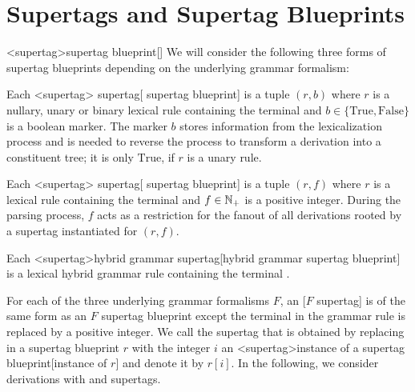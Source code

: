 \documentclass[../../document.tex]{subfiles}
\begin{document}
    \section{Supertags and Supertag Blueprints}\label{sec:supertags}<supertag>{supertag blueprint}[]
    We will consider the following three forms of supertag blueprints depending on the underlying grammar formalism:
    \begin{compactenum}
        \item
            Each <supertag>{ supertag}[ supertag blueprint] is a tuple \((r, b)\) where \(r\) is a nullary, unary or binary lexical  rule containing the terminal \wildcard{} and \(b \in \{\text{True}, \text{False}\}\) is a boolean marker.
            The marker \(b\) stores information from the lexicalization process and is needed to reverse the process to transform a derivation into a constituent tree; it is only \(\text{True}\), if \(r\) is a unary rule.
        \item
            Each <supertag>{ supertag}[ supertag blueprint] is a tuple \((r, f)\) where \(r\) is a lexical  rule containing the terminal \wildcard{} and \(f \in \mathbb{N}_+\) is a positive integer.
            During the parsing process, \(f\) acts as a restriction for the fanout of all derivations rooted by a supertag instantiated for \((r,f)\).
        \item Each <supertag>{hybrid grammar supertag}[hybrid grammar supertag blueprint] is a lexical hybrid grammar rule containing the terminal \wildcard{}.
    \end{compactenum}
    For each of the three underlying grammar formalisms \(F\), an [\(F\) supertag] is of the same form as an \(F\) supertag blueprint except the terminal \wildcard{} in the grammar rule is replaced by a positive integer.
    We call the supertag that is obtained by replacing \wildcard{} in a supertag blueprint \(r\) with the integer \(i\) an <supertag>{instance of a supertag blueprint}[instance of \(r\)] and denote it by \(r[i]\).
    In the following, we consider derivations with  and  supertags.
\end{document}
